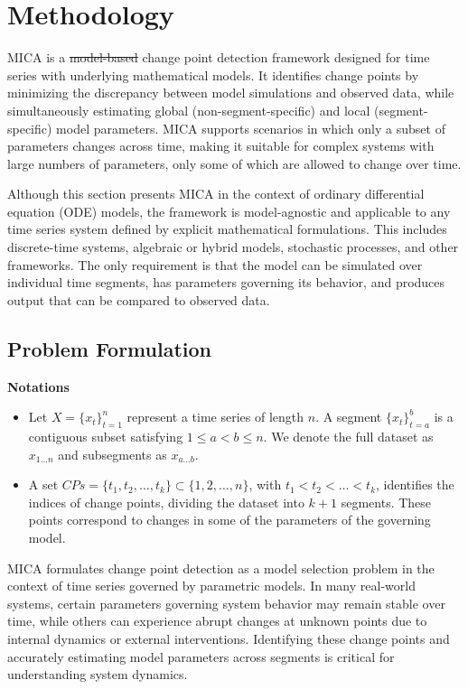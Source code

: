 \documentclass[10pt,letterpaper]{article}
\makeatletter
\providecommand{\DIFaddtex}[1]{{\protect\color{blue}\uwave{#1}}} %
\providecommand{\DIFdeltex}[1]{{\protect\color{red}\sout{#1}}} %
\providecommand{\DIFaddbegin}{} %
\providecommand{\DIFaddend}{} %
\providecommand{\DIFdelbegin}{} %
\providecommand{\DIFdelend}{} %
\providecommand{\DIFadd}[1]{\texorpdfstring{\DIFaddtex{#1}}{#1}} %
\providecommand{\DIFdel}[1]{\texorpdfstring{\DIFdeltex{#1}}{}} %
\providecommand{\DIFscaledelfig}{0.5}
\newlength{\DIFdelgraphicswidth} %
\newlength{\DIFdelgraphicsheight} %
\providecommand{\DIFaddincludegraphics}[2][]{{\color{blue}\fbox{\DIFOincludegraphics[#1]{#2}}}} %
\providecommand{\DIFdelincludegraphics}[2][]{%
\sbox{\DIFdelgraphicsbox}{\DIFOincludegraphics[#1]{#2}}%
\settoboxwidth{\DIFdelgraphicswidth}{\DIFdelgraphicsbox} %
\settoboxtotalheight{\DIFdelgraphicsheight}{\DIFdelgraphicsbox} %
\scalebox{\DIFscaledelfig}{%
\parbox[b]{\DIFdelgraphicswidth}{\usebox{\DIFdelgraphicsbox}\\[-\baselineskip] \rule{\DIFdelgraphicswidth}{0em}}\llap{\resizebox{\DIFdelgraphicswidth}{\DIFdelgraphicsheight}{%
\setlength{\unitlength}{\DIFdelgraphicswidth}%
\begin{picture}(1,1)%
\thicklines\linethickness{2pt} %
{\color[rgb]{1,0,0}\put(0,0){\framebox(1,1){}}}%
{\color[rgb]{1,0,0}\put(0,0){\line( 1,1){1}}}%
{\color[rgb]{1,0,0}\put(0,1){\line(1,-1){1}}}%
\end{picture}%
}\hspace*{3pt}}} %
} %
\DeclareRobustCommand{\DIFaddbegin}{\DIFOaddbegin \let\includegraphics\DIFaddincludegraphics} %
\DeclareRobustCommand{\DIFaddend}{\DIFOaddend \let\includegraphics\DIFOincludegraphics} %
\DeclareRobustCommand{\DIFdelbegin}{\DIFOdelbegin \let\includegraphics\DIFdelincludegraphics} %
\DeclareRobustCommand{\DIFdelend}{\DIFOaddend \let\includegraphics\DIFOincludegraphics} %
\let\sout@orig\sout %
\renewcommand{\sout}[1]{\ifmmode\text{\sout@orig{\ensuremath{#1}}}\else\sout@orig{#1}\fi} %
\makeatother
\begin{document}
\section*{Methodology}
\label{s:model}

MICA is a \DIFdelbegin \DIFdel{model-based }\DIFdelend \DIFaddbegin \DIFadd{model-informed }\DIFaddend change point detection framework designed for time series with underlying mathematical models. It identifies change points by minimizing the discrepancy between model simulations and observed data, while simultaneously estimating global (non-segment-specific) and local (segment-specific) model parameters. MICA supports scenarios in which only a subset of parameters changes across time, making it suitable for complex systems with large numbers of parameters, only some of which are allowed to change over time.

Although this section presents MICA in the context of ordinary differential equation (ODE) models, the framework is model-agnostic and applicable to any time series system defined by explicit mathematical formulations. This includes discrete-time systems, algebraic or hybrid models, stochastic processes, and other frameworks. The only requirement is that the model can be simulated over individual time segments, has parameters governing its behavior, and produces output that can be compared to observed data.

\subsection*{Problem Formulation}

\vspace{0.5em}
\textbf{Notations}
\begin{itemize}
  \item Let \( X = \{x_t\}_{t=1}^n \) represent a time series of length \( n \). A segment \( \{x_t\}_{t=a}^b \) is a contiguous subset satisfying \( 1 \leq a < b \leq n \). We denote the full dataset as \( x_{1...n} \) and subsegments as \( x_{a...b} \).

  \item A set \( CPs = \{ t_1, t_2, \dots, t_k \} \subset \{1, 2, \dots, n\} \), with \( t_1 < t_2 < \dots < t_k \), identifies the indices of change points, dividing the dataset into \( k+1 \) segments. These points correspond to changes in some of the parameters of the governing model.
\end{itemize}

MICA formulates change point detection as a model selection problem in the context of time series governed by parametric models. In many real-world systems, certain parameters governing system behavior may remain stable over time, while others can experience abrupt changes at unknown points due to internal dynamics or external interventions. Identifying these change points and accurately estimating model parameters across segments is critical for understanding system dynamics.
\end{document}
